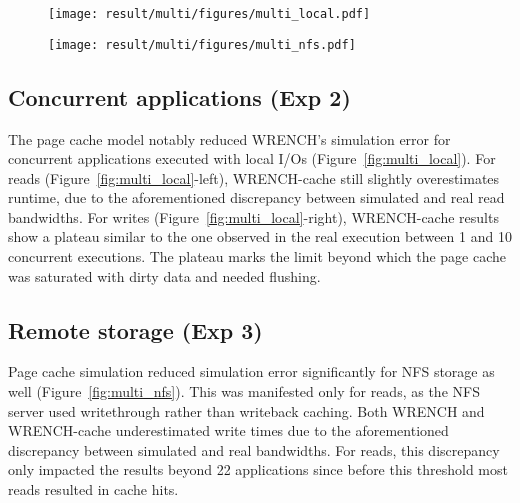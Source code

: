 \documentclass[conference]{IEEEtran}
\newcommand{\wrench}{WRENCH\xspace}
\begin{document}
            \begin{figure*}
                \begin{subfigure}{\linewidth}
                    \centering
                    \texttt{[image: result/multi/figures/multi\_local.pdf]}
                \end{subfigure}
                \caption{Concurrent results with 3~GB files, 5 repetitions (\textit{Exp 2})}
                \label{fig:multi_local}
            \end{figure*}
            \begin{figure*}
                \begin{subfigure}{\linewidth}
                    \centering
                    \texttt{[image: result/multi/figures/multi\_nfs.pdf]}
                \end{subfigure}
                \caption{NFS results with 3~GB files, 5 repetitions (\textit{Exp 3})}
                \label{fig:multi_nfs}
                \end{figure*}
        \subsection{Concurrent applications (Exp 2)}

            The page cache model notably reduced \wrench's simulation error
            for concurrent applications executed with local I/Os
            (Figure~\ref{fig:multi_local}). For reads (Figure~\ref{fig:multi_local}-left), \wrench-cache still
            slightly overestimates runtime, due to the aforementioned discrepancy between
            simulated and real read bandwidths.
            For writes (Figure~\ref{fig:multi_local}-right), \wrench-cache results show a
            plateau similar to the one observed in the real
            execution between 1 and 10 concurrent executions. The plateau marks the limit beyond which the page cache was
            saturated with dirty data and needed flushing.


        \subsection{Remote storage (Exp 3)}

            Page cache simulation  reduced simulation error significantly for
            NFS storage as well (Figure~\ref{fig:multi_nfs}). This
            was manifested only for reads, as the NFS server used writethrough rather than writeback caching.
            Both \wrench and \wrench-cache
            underestimated write times due to the aforementioned discrepancy between
            simulated and real bandwidths. For reads,
            this discrepancy only impacted the results beyond 22
            applications since before this threshold most reads resulted in cache
            hits.
\end{document}
